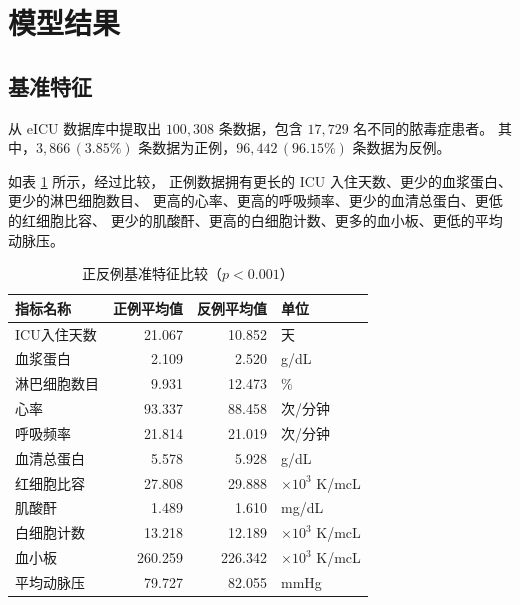 \section{模型结果}

\subsection{基准特征}

从 eICU 数据库中提取出 $100,308$ 条数据，包含 $17,729$ 名不同的脓毒症患者。%
其中，$3,866\,(3.85\%)$ 条数据为正例，$96,442\,(96.15\%)$ 条数据为反例。

如表 \ref{table:baseline-comparison} 所示，经过比较，%
正例数据拥有更长的 ICU 入住天数、更少的血浆蛋白、更少的淋巴细胞数目、%
更高的心率、更高的呼吸频率、更少的血清总蛋白、更低的红细胞比容、%
更少的肌酸酐、更高的白细胞计数、更多的血小板、更低的平均动脉压。

\begin{table}[htb]
    \centering
    \begin{tabular}{lrrl}
        \toprule
        指标名称    & 正例平均值   & 反例平均值   & 单位                  \\
        \midrule
        ICU入住天数 & 21.067  & 10.852  & 天                   \\
        血浆蛋白    & 2.109   & 2.520   & g/dL                \\
        淋巴细胞数目  & 9.931   & 12.473  & \%                  \\
        心率      & 93.337  & 88.458  & 次/分钟                \\
        呼吸频率    & 21.814  & 21.019  & 次/分钟                \\
        血清总蛋白   & 5.578   & 5.928   & g/dL                \\
        红细胞比容   & 27.808  & 29.888  & $\times 10^3$ K/mcL \\
        肌酸酐     & 1.489   & 1.610   & mg/dL               \\
        白细胞计数   & 13.218  & 12.189  & $\times 10^3$ K/mcL \\
        血小板     & 260.259 & 226.342 & $\times 10^3$ K/mcL \\
        平均动脉压   & 79.727  & 82.055  & mmHg                \\
        \bottomrule
    \end{tabular}
    \caption{正反例基准特征比较（$p<0.001$）}
    \label{table:baseline-comparison}
\end{table}

